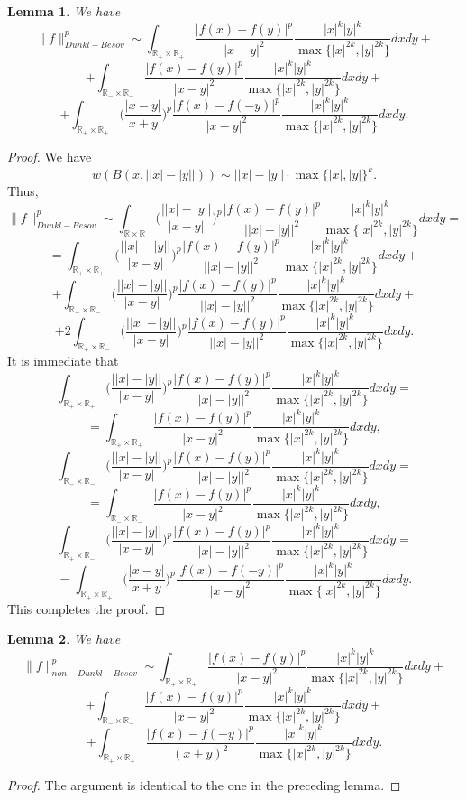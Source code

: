 \documentclass{amsart}
\newtheorem{lem}{Lemma}
\begin{document}
\begin{lem} We have
$$\|f\|_{Dunkl-Besov}^p\sim \int_{\mathbb{R}_+\times\mathbb{R}_+}\frac{|f(x)-f(y)|^p}{|x-y|^2}\frac{|x|^k|y|^k}{\max\{|x|^{2k},|y|^{2k}\}}dxdy+$$
$$+\int_{\mathbb{R}_-\times\mathbb{R}_-}\frac{|f(x)-f(y)|^p}{|x-y|^2}\frac{|x|^k|y|^k}{\max\{|x|^{2k},|y|^{2k}\}}dxdy+$$
$$+\int_{\mathbb{R}_+\times\mathbb{R}_+}\Big(\frac{|x-y|}{x+y}\Big)^p\frac{|f(x)-f(-y)|^p}{|x-y|^2}\frac{|x|^k|y|^k}{\max\{|x|^{2k},|y|^{2k}\}}dxdy.$$
\end{lem}
\begin{proof} We have 
$$w(B(x,\big||x|-|y|\big|))\sim \big||x|-|y|\big|\cdot \max\{|x|,|y|\}^k.$$
Thus,
$$\|f\|_{Dunkl-Besov}^p\sim\int_{\mathbb{R}\times\mathbb{R}}\Big(\frac{\big||x|-|y|\big|}{|x-y|}\Big)^p\frac{|f(x)-f(y)|^p}{\big||x|-|y|\big|^2}\frac{|x|^k|y|^k}{\max\{|x|^{2k},|y|^{2k}\}}dxdy=$$
$$=\int_{\mathbb{R}_+\times\mathbb{R}_+}\Big(\frac{\big||x|-|y|\big|}{|x-y|}\Big)^p\frac{|f(x)-f(y)|^p}{\big||x|-|y|\big|^2}\frac{|x|^k|y|^k}{\max\{|x|^{2k},|y|^{2k}\}}dxdy+$$
$$+\int_{\mathbb{R}_-\times\mathbb{R}_-}\Big(\frac{\big||x|-|y|\big|}{|x-y|}\Big)^p\frac{|f(x)-f(y)|^p}{\big||x|-|y|\big|^2}\frac{|x|^k|y|^k}{\max\{|x|^{2k},|y|^{2k}\}}dxdy+$$
$$+2\int_{\mathbb{R}_+\times\mathbb{R}_-}\Big(\frac{\big||x|-|y|\big|}{|x-y|}\Big)^p\frac{|f(x)-f(y)|^p}{\big||x|-|y|\big|^2}\frac{|x|^k|y|^k}{\max\{|x|^{2k},|y|^{2k}\}}dxdy.$$
It is immediate that
$$\int_{\mathbb{R}_+\times\mathbb{R}_+}\Big(\frac{\big||x|-|y|\big|}{|x-y|}\Big)^p\frac{|f(x)-f(y)|^p}{\big||x|-|y|\big|^2}\frac{|x|^k|y|^k}{\max\{|x|^{2k},|y|^{2k}\}}dxdy=$$
$$=\int_{\mathbb{R}_+\times\mathbb{R}_+}\frac{|f(x)-f(y)|^p}{|x-y|^2}\frac{|x|^k|y|^k}{\max\{|x|^{2k},|y|^{2k}\}}dxdy,$$
$$\int_{\mathbb{R}_-\times\mathbb{R}_-}\Big(\frac{\big||x|-|y|\big|}{|x-y|}\Big)^p\frac{|f(x)-f(y)|^p}{\big||x|-|y|\big|^2}\frac{|x|^k|y|^k}{\max\{|x|^{2k},|y|^{2k}\}}dxdy=$$
$$=\int_{\mathbb{R}_-\times\mathbb{R}_-}\frac{|f(x)-f(y)|^p}{|x-y|^2}\frac{|x|^k|y|^k}{\max\{|x|^{2k},|y|^{2k}\}}dxdy,$$
$$\int_{\mathbb{R}_+\times\mathbb{R}_-}\Big(\frac{\big||x|-|y|\big|}{|x-y|}\Big)^p\frac{|f(x)-f(y)|^p}{\big||x|-|y|\big|^2}\frac{|x|^k|y|^k}{\max\{|x|^{2k},|y|^{2k}\}}dxdy=$$
$$=\int_{\mathbb{R}_+\times\mathbb{R}_+}\Big(\frac{|x-y|}{x+y}\Big)^p\frac{|f(x)-f(-y)|^p}{|x-y|^2}\frac{|x|^k|y|^k}{\max\{|x|^{2k},|y|^{2k}\}}dxdy.$$
This completes the proof.
\end{proof}

\begin{lem} We have
$$\|f\|_{non-Dunkl-Besov}^p\sim \int_{\mathbb{R}_+\times\mathbb{R}_+}\frac{|f(x)-f(y)|^p}{|x-y|^2}\frac{|x|^k|y|^k}{\max\{|x|^{2k},|y|^{2k}\}}dxdy+$$
$$+\int_{\mathbb{R}_-\times\mathbb{R}_-}\frac{|f(x)-f(y)|^p}{|x-y|^2}\frac{|x|^k|y|^k}{\max\{|x|^{2k},|y|^{2k}\}}dxdy+$$
$$+\int_{\mathbb{R}_+\times\mathbb{R}_+}\frac{|f(x)-f(-y)|^p}{(x+y)^2}\frac{|x|^k|y|^k}{\max\{|x|^{2k},|y|^{2k}\}}dxdy.$$
\end{lem}
\begin{proof} The argument is identical to the  one in the preceding lemma.
\end{proof}
\end{document}
